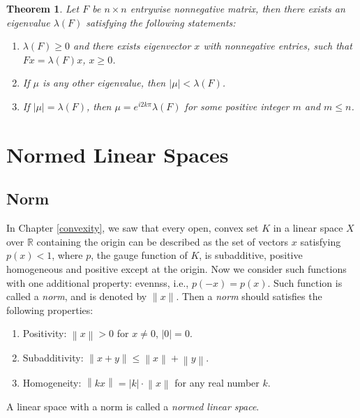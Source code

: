 \documentclass[10pt]{book}
\newtheorem{theorem}{Theorem}[chapter]
\theoremstyle{definition}
\numberwithin{equation}{chapter}
\begin{document}
\medskip

\begin{theorem}
Let $F$ be $n \times n$ entrywise nonnegative matrix, then there exists an eigenvalue $\lambda(F)$ satisfying the following statements:
\begin{enumerate}[label=(\alph*)]
    \item $\lambda(F) \geq 0$ and there exists eigenvector $x$ with nonnegative entries, such that $Fx = \lambda(F) x$, $x \geq 0$.
    
    \item If $\mu$ is any other eigenvalue, then $\left|\mu\right| < \lambda(F)$.
    
    \item If $\left|\mu\right| = \lambda(F)$, then $\mu = e^{i2k\pi} \lambda(F)$ for some positive integer $m$ and $m \leq n$.
\end{enumerate}
\end{theorem}



\chapter{Normed Linear Spaces}

\section{Norm}

In Chapter \ref{convexity}, we saw that every open, convex set $K$ in a linear space $X$ over $\mathbb{R}$ containing the origin can be described as the set of vectors $x$ satisfying $p(x) < 1$, where $p$, the gauge function of $K$, is subadditive, positive homogeneous and positive except at the origin. Now we consider such functions with one additional property: evennss, i.e., $p(-x) = p(x)$. Such function is called a {\em norm}, and is denoted by $\|x\|$. Then a {\em norm} should satisfies the following properties:
\begin{enumerate}[label=(\roman*)]
    \item Positivity: $\left\|x\right\| > 0$ for $x \neq 0$, $\left|0\right| = 0$.
    
    \item Subadditivity: $\left\|x+y\right\| \leq \left\|x\right\| + \left\|y\right\|$.
    
    \item Homogeneity: $\left\|kx\right\| = |k| \cdot \left\|x\right\|$ for any real number $k$.
\end{enumerate}
A linear space with a norm is called a {\em normed linear space}.
\end{document}
